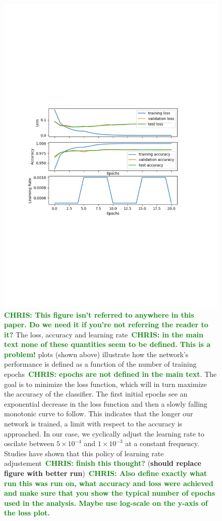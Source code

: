 \documentclass[%
 amsmath,amssymb,
 aps,
 twocolumn,
 prl,
 reprint,
floatfix,
]{revtex4-1}
\newcommand{\chris}[1]{\textbf{\textcolor{green}{CHRIS: #1}}}
\begin{document}
\begin{figure} 
\includegraphics[width=\columnwidth]{figures/loss.pdf}
\caption{\label{fig:loss_curve} \chris{This figure isn't referred to anywhere
in this paper. Do we need it if you're not referring the reader to it?} The
loss, accuracy and learning rate~\chris{in the main text none of these
quantities seem to be defined. This is a problem!} plots (shown above)
illustrate how the network's performance is defined as a function of the number
of training epochs~\chris{epochs are not defined in the main text}. The goal is
to minimize the loss function, which will in turn maximize the accuracy of the
classifier. The first initial epochs see an exponential decrease in the loss
function and then a slowly falling monotonic curve to follow. This indicates
that the longer our network is trained, a limit with respect to the accuracy is
approached. In our case, we cyclically adjust the learning rate to oscilate
between $5 \times 10^{-4}$ and $1 \times 10^{-3}$ at a constant frequency.
Studies have shown that this policy of learning rate adjustement~\chris{finish
this thought?} (\textbf{should replace figure with better run})~\chris{Also
define exactly what run this was run on, what accuracy and loss were achieved
and make sure that you show the typical number of epochs used in the analysis.
Maybe use log-scale on the y-axis of the loss plot.}} 
\end{figure}
\end{document}
